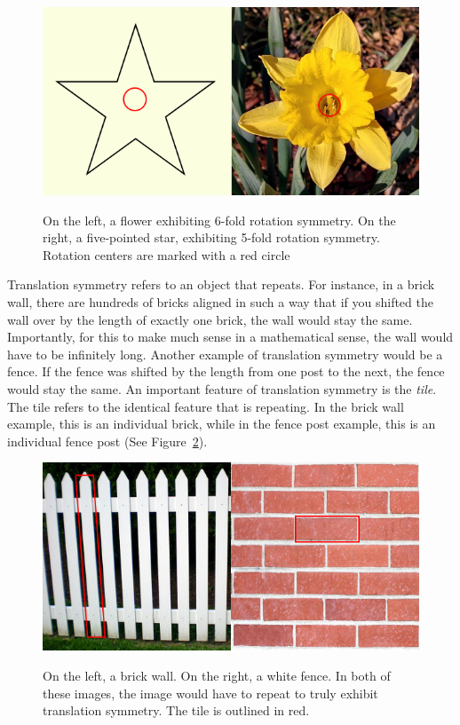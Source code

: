 \begin{figure}
\centering
\includegraphics[width=0.9\columnwidth]{rotation}
\label{rot}
\caption{On the left, a flower exhibiting 6-fold rotation symmetry. On the right, a five-pointed star, exhibiting 5-fold rotation symmetry. Rotation centers are marked with a red circle}
\end{figure}

Translation symmetry refers to an object that repeats. For instance, in a brick wall, there are hundreds of bricks aligned in such a way that if you shifted the wall over by the length of exactly one brick, the wall would stay the same. Importantly, for this to make much sense in a mathematical sense, the wall would have to be infinitely long. Another example of translation symmetry would be a fence. If the fence was shifted by the length from one post to the next, the fence would stay the same. An important feature of translation symmetry is the \textit{tile}. The tile refers to the identical feature that is repeating. In the brick wall example, this is an individual brick, while in the fence post example, this is an individual fence post (See Figure~\ref{trans}).

\begin{figure}
\centering
\includegraphics[width=0.9\columnwidth]{translation}
\label{trans}
\caption{On the left, a brick wall. On the right, a white fence. In both of these images, the image would have to repeat to truly exhibit translation symmetry. The tile is outlined in red.}
\end{figure}

